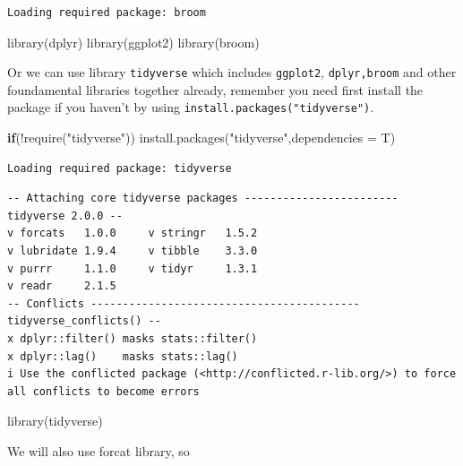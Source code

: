 \documentclass[
  letterpaper,
  DIV=11,
  numbers=noendperiod]{scrreprt}
\newenvironment{Shaded}{\begin{snugshade}}{\end{snugshade}}
\newcommand{\AttributeTok}[1]{\textcolor[rgb]{0.40,0.45,0.13}{#1}}
\newcommand{\ControlFlowTok}[1]{\textcolor[rgb]{0.00,0.23,0.31}{\textbf{#1}}}
\newcommand{\FunctionTok}[1]{\textcolor[rgb]{0.28,0.35,0.67}{#1}}
\newcommand{\NormalTok}[1]{\textcolor[rgb]{0.00,0.23,0.31}{#1}}
\newcommand{\SpecialCharTok}[1]{\textcolor[rgb]{0.37,0.37,0.37}{#1}}
\newcommand{\StringTok}[1]{\textcolor[rgb]{0.13,0.47,0.30}{#1}}
\begin{document}
\begin{verbatim}
Loading required package: broom
\end{verbatim}

\begin{Shaded}
\begin{Highlighting}[]
\FunctionTok{library}\NormalTok{(dplyr) }
\FunctionTok{library}\NormalTok{(ggplot2)}
\FunctionTok{library}\NormalTok{(broom)}
\end{Highlighting}
\end{Shaded}

Or we can use library \texttt{tidyverse} which includes
\texttt{ggplot2}, \texttt{dplyr,broom} and other foundamental libraries
together already, remember you need first install the package if you
haven't by using \texttt{install.packages("tidyverse")}.

\begin{Shaded}
\begin{Highlighting}[]
\ControlFlowTok{if}\NormalTok{(}\SpecialCharTok{!}\FunctionTok{require}\NormalTok{(}\StringTok{"tidyverse"}\NormalTok{))}
  \FunctionTok{install.packages}\NormalTok{(}\StringTok{"tidyverse"}\NormalTok{,}\AttributeTok{dependencies =}\NormalTok{ T)}
\end{Highlighting}
\end{Shaded}

\begin{verbatim}
Loading required package: tidyverse
\end{verbatim}

\begin{verbatim}
-- Attaching core tidyverse packages ------------------------ tidyverse 2.0.0 --
v forcats   1.0.0     v stringr   1.5.2
v lubridate 1.9.4     v tibble    3.3.0
v purrr     1.1.0     v tidyr     1.3.1
v readr     2.1.5     
-- Conflicts ------------------------------------------ tidyverse_conflicts() --
x dplyr::filter() masks stats::filter()
x dplyr::lag()    masks stats::lag()
i Use the conflicted package (<http://conflicted.r-lib.org/>) to force all conflicts to become errors
\end{verbatim}

\begin{Shaded}
\begin{Highlighting}[]
\FunctionTok{library}\NormalTok{(tidyverse)}
\end{Highlighting}
\end{Shaded}

We will also use forcat library, so
\end{document}
